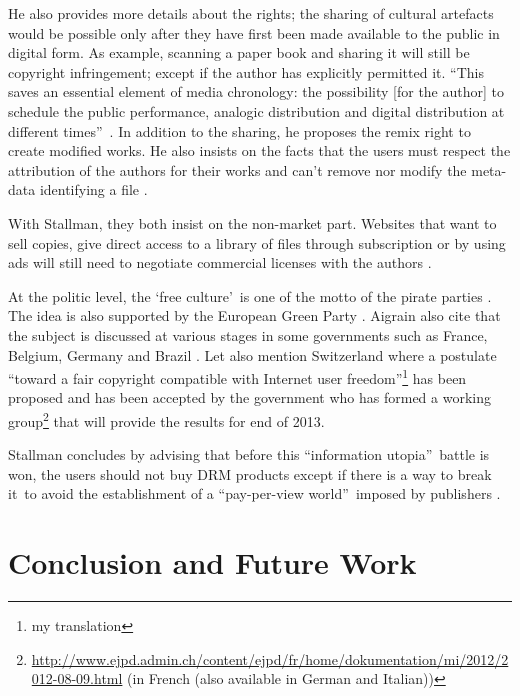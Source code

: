 \documentclass[11pt,a4paper,oneside]{memoir}
\begin{document}
He also provides more details about the rights; the sharing of cultural artefacts would be possible only after they have first been made available to the public in digital form. As example, scanning a paper book and sharing it will still be copyright infringement; except if the author has explicitly permitted it. \textquotedblleft This saves an essential element of media chronology: the possibility [for the author] to schedule the public performance, analogic distribution and digital distribution at different times\textquotedblright ~\cite[section 6.1, p. 84]{aigrain:sharing}. In addition to the sharing, he proposes the remix right to create modified works. He also insists on the facts that the users must respect the attribution of the authors for their works and can't remove nor modify the meta-data identifying a file \cite[section 6.2]{aigrain:sharing}.

With Stallman, they both insist on the non-market part. Websites that want to sell copies, give direct access to a library of files through subscription or by using ads will still need to negotiate commercial licenses with the authors \cite[section 6.2]{aigrain:sharing}.

At the politic level, the \textquoteleft free culture\textquoteright ~is one of the motto of the pirate parties \cite{pirate:who}. The idea is also supported by the European Green Party \cite{green:digital_right}. Aigrain also cite that the subject is discussed at various stages in some governments such as France, Belgium, Germany and Brazil \cite[section 5.3]{aigrain:sharing}. Let also mention Switzerland where a postulate \textquotedblleft toward a fair copyright compatible with Internet user freedom\textquotedblright \footnote{my translation} \cite{parlement:12.3326} has been proposed and has been accepted by the government who has formed a working group\footnote{\url{http://www.ejpd.admin.ch/content/ejpd/fr/home/dokumentation/mi/2012/2012-08-09.html} (in French (also available in German and Italian))} that will provide the results for end of 2013.

Stallman concludes by advising that before this \textquotedblleft information utopia\textquotedblright ~battle is won, the users should not buy DRM products \textendash except if there is a way to break it\textendash ~to avoid the establishment of a \textquotedblleft pay-per-view world\textquotedblright ~imposed by publishers \cite{gnu:freedom_or_copyright}.


\chapter{Conclusion and Future Work}
\end{document}
